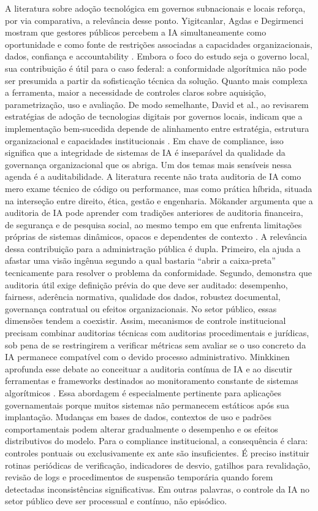 \documentclass[12pt,a4paper]{article}
\begin{document}
A literatura sobre adoção tecnológica em governos subnacionais e locais reforça, por via comparativa, a relevância desse ponto. Yigitcanlar, Agdas e Degirmenci mostram que gestores públicos percebem a IA simultaneamente como oportunidade e como fonte de restrições associadas a capacidades organizacionais, dados, confiança e accountability \autocite{yiitcanlar2022artificial}. Embora o foco do estudo seja o governo local, sua contribuição é útil para o caso federal: a conformidade algorítmica não pode ser presumida a partir da sofisticação técnica da solução. Quanto mais complexa a ferramenta, maior a necessidade de controles claros sobre aquisição, parametrização, uso e avaliação. De modo semelhante, David et al., ao revisarem estratégias de adoção de tecnologias digitais por governos locais, indicam que a implementação bem-sucedida depende de alinhamento entre estratégia, estrutura organizacional e capacidades institucionais \autocite{david2023understanding}. Em chave de compliance, isso significa que a integridade de sistemas de IA é inseparável da qualidade da governança organizacional que os abriga.
Um dos temas mais sensíveis nessa agenda é a auditabilidade. A literatura recente não trata auditoria de IA como mero exame técnico de código ou performance, mas como prática híbrida, situada na interseção entre direito, ética, gestão e engenharia. Mökander argumenta que a auditoria de IA pode aprender com tradições anteriores de auditoria financeira, de segurança e de pesquisa social, ao mesmo tempo em que enfrenta limitações próprias de sistemas dinâmicos, opacos e dependentes de contexto \autocite{mkander2023auditing}. A relevância dessa contribuição para a administração pública é dupla. Primeiro, ela ajuda a afastar uma visão ingênua segundo a qual bastaria “abrir a caixa-preta” tecnicamente para resolver o problema da conformidade. Segundo, demonstra que auditoria útil exige definição prévia do que deve ser auditado: desempenho, fairness, aderência normativa, qualidade dos dados, robustez documental, governança contratual ou efeitos organizacionais. No setor público, essas dimensões tendem a coexistir. Assim, mecanismos de controle institucional precisam combinar auditorias técnicas com auditorias procedimentais e jurídicas, sob pena de se restringirem a verificar métricas sem avaliar se o uso concreto da IA permanece compatível com o devido processo administrativo.
Minkkinen aprofunda esse debate ao conceituar a auditoria contínua de IA e ao discutir ferramentas e frameworks destinados ao monitoramento constante de sistemas algorítmicos \autocite{minkkinen2022continuous}. Essa abordagem é especialmente pertinente para aplicações governamentais porque muitos sistemas não permanecem estáticos após sua implantação. Mudanças em bases de dados, contextos de uso e padrões comportamentais podem alterar gradualmente o desempenho e os efeitos distributivos do modelo. Para o compliance institucional, a consequência é clara: controles pontuais ou exclusivamente ex ante são insuficientes. É preciso instituir rotinas periódicas de verificação, indicadores de desvio, gatilhos para revalidação, revisão de logs e procedimentos de suspensão temporária quando forem detectadas inconsistências significativas. Em outras palavras, o controle da IA no setor público deve ser processual e contínuo, não episódico.
\end{document}
